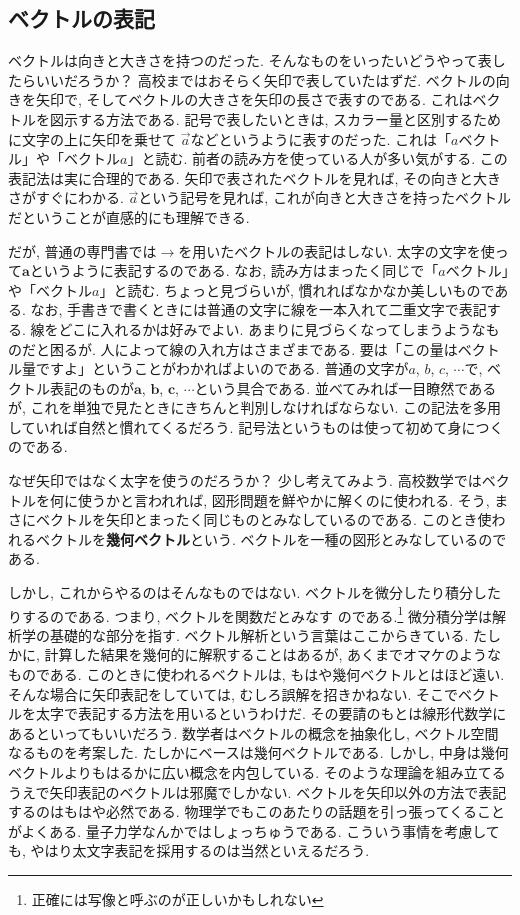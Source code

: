 \subsection{ベクトルの表記}
ベクトルは向きと大きさを持つのだった. 
そんなものをいったいどうやって表したらいいだろうか？ 高校まではおそらく矢印で表していたはずだ. 
ベクトルの向きを矢印で, そしてベクトルの大きさを矢印の長さで表すのである. 
これはベクトルを図示する方法である. 記号で表したいときは, スカラー量と区別するために文字の上に矢印を乗せて
$\vec{a}$などというように表すのだった. これは「$a$ベクトル」や「ベクトル$a$」と読む. 前者の読み方を使っている人が多い気がする. 
この表記法は実に合理的である. 
矢印で表されたベクトルを見れば, その向きと大きさがすぐにわかる. 
$\vec{a}$という記号を見れば, これが向きと大きさを持ったベクトルだということが直感的にも理解できる. 

だが, 普通の専門書では$\to$を用いたベクトルの表記はしない. 太字の文字を使って$\bm{a}$というように表記するのである. 
なお, 読み方はまったく同じで「$a$ベクトル」や「ベクトル$a$」と読む. 
ちょっと見づらいが, 慣れればなかなか美しいものである. なお, 手書きで書くときには普通の文字に線を一本入れて二重文字で表記する. 
線をどこに入れるかは好みでよい. あまりに見づらくなってしまうようなものだと困るが. 人によって線の入れ方はさまざまである. 
要は「この量はベクトル量ですよ」ということがわかればよいのである. 
普通の文字が$a$, $b$, $c$, $\cdots$で, ベクトル表記のものが$\bm{a}$, $\bm{b}$, $\bm{c}$, $\cdots$という具合である. 
並べてみれば一目瞭然であるが, これを単独で見たときにきちんと判別しなければならない. 
この記法を多用していれば自然と慣れてくるだろう. 記号法というものは使って初めて身につくのである. 

なぜ矢印ではなく太字を使うのだろうか？ 少し考えてみよう. 高校数学ではベクトルを何に使うかと言われれば, 
図形問題を鮮やかに解くのに使われる. そう, まさにベクトルを矢印とまったく同じものとみなしているのである. 
このとき使われるベクトルを\textbf{幾何ベクトル}という. ベクトルを一種の図形とみなしているのである. 

しかし, これからやるのはそんなものではない. ベクトルを微分したり積分したりするのである. 
つまり, ベクトルを関数だとみなす
のである.\footnote{正確には写像と呼ぶのが正しいかもしれない} 微分積分学は解析学の基礎的な部分を指す. 
ベクトル解析という言葉はここからきている. 
たしかに, 計算した結果を幾何的に解釈することはあるが, あくまでオマケのようなものである. 
このときに使われるベクトルは, もはや幾何ベクトルとはほど遠い. 
そんな場合に矢印表記をしていては, むしろ誤解を招きかねない. 
そこでベクトルを太字で表記する方法を用いるというわけだ. 
その要請のもとは線形代数学にあるといってもいいだろう. 
数学者はベクトルの概念を抽象化し, ベクトル空間なるものを考案した. 
たしかにベースは幾何ベクトルである. しかし, 中身は幾何ベクトルよりもはるかに広い概念を内包している. 
そのような理論を組み立てるうえで矢印表記のベクトルは邪魔でしかない. 
ベクトルを矢印以外の方法で表記するのはもはや必然である. 
物理学でもこのあたりの話題を引っ張ってくることがよくある. 量子力学なんかではしょっちゅうである. 
こういう事情を考慮しても, やはり太文字表記を採用するのは当然といえるだろう. 

